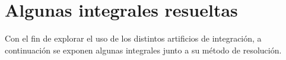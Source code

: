 \section{Algunas integrales resueltas}
Con el fin de explorar el uso de los distintos artificios de integración, a continuación se exponen algunas integrales junto a su método de resolución.